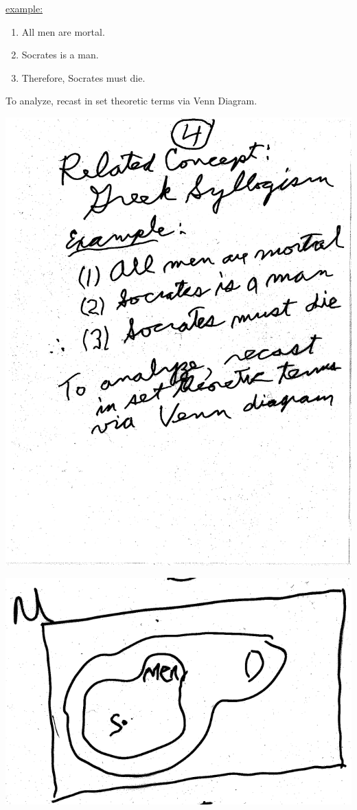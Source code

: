 \documentclass[10pt,a4paper]{article}
\begin{document}
\underline{example:}
\begin{enumerate}
\item All men are mortal.
\item Socrates is a man.
\item Therefore, Socrates must die. 
\end{enumerate}

To analyze, recast in set theoretic terms via Venn Diagram.

\includegraphics[scale=.5]{Pages/ST_4}

\newpage

\includegraphics[scale=.2]{Pages/ST_5_im1}
\end{document}

